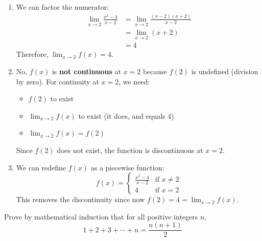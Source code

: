 \begin{solution}
\begin{enumerate}[label=(\alph*)]
    \item We can factor the numerator:
    \begin{align*}
        \lim_{x \to 2} \frac{x^2 - 4}{x - 2} &= \lim_{x \to 2} \frac{(x-2)(x+2)}{x - 2} \\
        &= \lim_{x \to 2} (x + 2) \\
        &= 4
    \end{align*}
    Therefore, $\lim_{x \to 2} f(x) = 4$.

    \item No, $f(x)$ is \textbf{not continuous} at $x = 2$ because $f(2)$ is undefined (division by zero). For continuity at $x = 2$, we need:
    \begin{itemize}
        \item $f(2)$ to exist
        \item $\lim_{x \to 2} f(x)$ to exist (it does, and equals 4)
        \item $\lim_{x \to 2} f(x) = f(2)$
    \end{itemize}
    Since $f(2)$ does not exist, the function is discontinuous at $x = 2$.

    \item We can redefine $f(x)$ as a piecewise function:
    \[
    f(x) = \begin{cases}
        \frac{x^2 - 4}{x - 2} & \text{if } x \neq 2 \\
        4 & \text{if } x = 2
    \end{cases}
    \]
    This removes the discontinuity since now $f(2) = 4 = \lim_{x \to 2} f(x)$.
\end{enumerate}
\end{solution}

\begin{problem}
Prove by mathematical induction that for all positive integers $n$,
\[
1 + 2 + 3 + \cdots + n = \frac{n(n+1)}{2}
\]
\end{problem}

